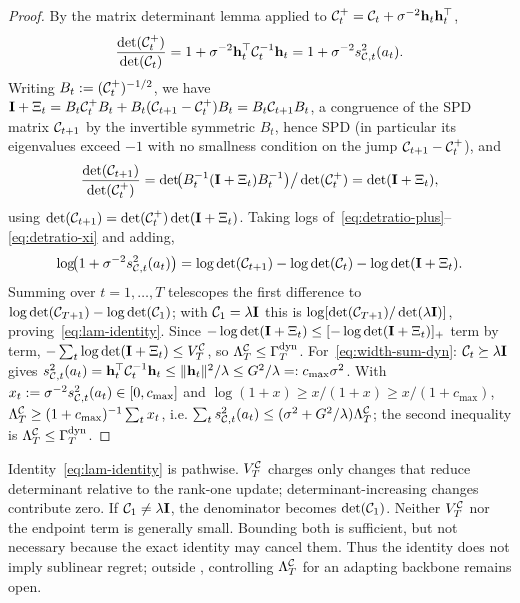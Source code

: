 \begin{proof}
By the matrix determinant lemma applied to
$\mathcal{C}_t^{+}=\mathcal{C}_t+\sigma^{-2}\mathbf{h}_t\mathbf{h}_t^\top$,
\begin{equation}\label{eq:detratio-plus}
  \frac{\det(\mathcal{C}_t^{+})}{\det(\mathcal{C}_t)}
  = 1+\sigma^{-2}\mathbf{h}_t^\top\mathcal{C}_t^{-1}\mathbf{h}_t
  = 1+\sigma^{-2}s_{\mathcal{C},t}^2(a_t).
\end{equation}
Writing $B_t:=(\mathcal{C}_t^{+})^{-1/2}$, we have
$\mathbf{I}+\Xi_t=B_t\mathcal{C}_t^{+}B_t+B_t(\mathcal{C}_{t+1}-\mathcal{C}_t^{+})B_t
=B_t\mathcal{C}_{t+1}B_t$, a congruence of the SPD matrix $\mathcal{C}_{t+1}$ by the
invertible symmetric $B_t$, hence SPD (in particular its eigenvalues exceed
$-1$ with no smallness condition on the jump $\mathcal{C}_{t+1}-\mathcal{C}_t^{+}$), and
\begin{equation}\label{eq:detratio-xi}
  \frac{\det(\mathcal{C}_{t+1})}{\det(\mathcal{C}_t^{+})}
  = \det\!\bigl(B_t^{-1}(\mathbf{I}+\Xi_t)B_t^{-1}\bigr)\big/\det(\mathcal{C}_t^{+})
  = \det(\mathbf{I}+\Xi_t),
\end{equation}
using $\det(\mathcal{C}_{t+1})=\det(\mathcal{C}_t^{+})\det(\mathbf{I}+\Xi_t)$.
Taking logs of~\eqref{eq:detratio-plus}--\eqref{eq:detratio-xi} and adding,
\[
  \log\!\bigl(1+\sigma^{-2}s_{\mathcal{C},t}^2(a_t)\bigr)
  = \log\det(\mathcal{C}_{t+1}) - \log\det(\mathcal{C}_t) - \log\det(\mathbf{I}+\Xi_t).
\]
Summing over $t=1,\dots,T$ telescopes the first difference to
$\log\det(\mathcal{C}_{T+1})-\log\det(\mathcal{C}_1)$; with $\mathcal{C}_1=\lambda\mathbf{I}$ this is
$\log[\det(\mathcal{C}_{T+1})/\det(\lambda\mathbf{I})]$, proving~\eqref{eq:lam-identity}.
Since $-\log\det(\mathbf{I}+\Xi_t)\le[-\log\det(\mathbf{I}+\Xi_t)]_+$ term by term,
$-\sum_t\log\det(\mathbf{I}+\Xi_t)\le V^{\mathcal{C}}_T$, so $\Lambda^{\mathcal{C}}_T\le\Gamma^{\mathrm{dyn}}_T$.
For~\eqref{eq:width-sum-dyn}: $\mathcal{C}_t\succeq\lambda\mathbf{I}$ gives
$s_{\mathcal{C},t}^2(a_t)=\mathbf{h}_t^\top\mathcal{C}_t^{-1}\mathbf{h}_t\le\|\mathbf{h}_t\|^2/\lambda\le
G^2/\lambda=:c_{\max}\sigma^2$.  With $x_t:=\sigma^{-2}s_{\mathcal{C},t}^2(a_t)\in
[0,c_{\max}]$ and $\log(1+x)\ge x/(1+x)\ge x/(1+c_{\max})$,
$\Lambda^{\mathcal{C}}_T\ge(1+c_{\max})^{-1}\sum_t x_t$, i.e.
$\sum_t s_{\mathcal{C},t}^2(a_t)\le(\sigma^2+G^2/\lambda)\Lambda^{\mathcal{C}}_T$; the second
inequality is $\Lambda^{\mathcal{C}}_T\le\Gamma^{\mathrm{dyn}}_T$.
\end{proof}

\begin{remark}
Identity~\eqref{eq:lam-identity} is pathwise.  $V^{\mathcal{C}}_T$ charges only changes
that reduce determinant relative to the rank-one update; determinant-increasing
changes contribute zero.  If $\mathcal{C}_1\ne\lambda\mathbf{I}$, the denominator becomes
$\det(\mathcal{C}_1)$.  Neither $V^{\mathcal{C}}_T$ nor the endpoint term is generally small.
Bounding both is sufficient, but not necessary because the exact identity may
cancel them.  Thus the identity does not imply sublinear regret; outside
, controlling $\Lambda^{\mathcal{C}}_T$ for an
adapting backbone remains open.
\end{remark}

